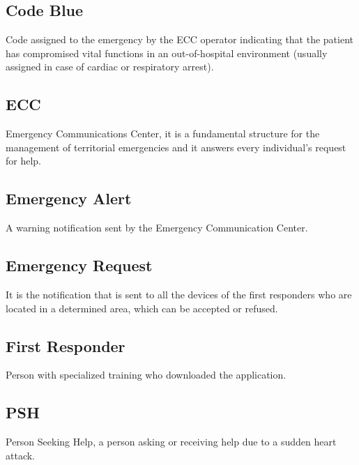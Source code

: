 \documentclass[11pt,a4paper]{article}
\begin{document}
\subsection*{Code Blue}
Code assigned to the emergency by the ECC operator indicating that the patient has compromised vital functions in an out-of-hospital environment (usually assigned in case of cardiac or respiratory arrest).

\subsection*{ECC}
Emergency Communications Center, it is a fundamental structure for the management of territorial emergencies and it answers every individual's request for help.

\subsection*{Emergency Alert}
A warning notification sent by the Emergency Communication Center.

\subsection*{Emergency Request}
It is the notification that is sent to all the devices of the first responders who are located in a determined area, which can be accepted or refused.

\subsection*{First Responder}
Person with specialized training who downloaded the application.

\subsection*{PSH}
Person Seeking Help, a person asking or receiving help due to a sudden heart attack.
\end{document}

